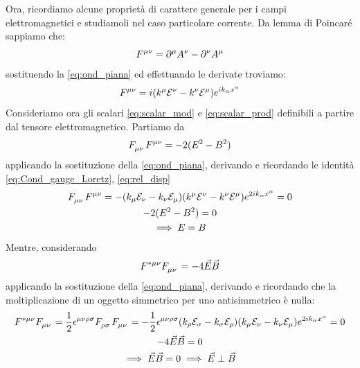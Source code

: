 Ora, ricordiamo alcune proprietà di carattere generale per i campi elettromagnetici e studiamoli nel caso particolare corrente. Da lemma di Poincaré sappiamo che:
\begin{equation*}
    F\indices{^{\mu \nu}}=\partial^\mu A^\nu -\partial^\nu A^\mu
\end{equation*}
sostituendo la \eqref{eq:ond_piana} ed effettuando le derivate troviamo:
\begin{equation}
    F\indices{^{\mu \nu}}=i(k^\mu\mathcal{E}^\nu-k^\nu\mathcal{E}^\mu)e^{ik_\alpha x^\alpha}
\end{equation}
Consideriamo ora gli scalari \eqref{eq:scalar_mod} e \eqref{eq:scalar_prod} definibili a partire dal tensore elettromagnetico. Partiamo da 
\begin{equation}
     F\indices{_{\mu\nu}}F\indices{^{\mu\nu}}=-2(E^2-B^2)
\end{equation} 
applicando la sostituzione della \eqref{eq:ond_piana}, derivando e ricordando le identità \eqref{eq:Cond_gauge_Loretz}, \eqref{eq:rel_disp}
\begin{equation}
\begin{gathered}
    F\indices{_{\mu\nu}}F\indices{^{\mu\nu}}=-(k_\mu\mathcal{E}_\nu-k_\nu\mathcal{E}_\mu)(k^\mu\mathcal{E}^\nu-k^\nu\mathcal{E}^\mu)e^{2ik_\alpha x^\alpha}=0\\
    -2(E^2-B^2)=0\\
      \implies E=B
\end{gathered}
\end{equation}
Mentre, considerando 
\begin{equation}
     F\indices{^{*\mu\nu}}F\indices{_{\mu\nu}}=-4\Vec{E}\Vec{B}
\end{equation} 
applicando la sostituzione della \eqref{eq:ond_piana}, derivando e ricordando che la moltiplicazione di un oggetto simmetrico per uno antisimmetrico è nulla:
\begin{equation}
\begin{gathered}
     F\indices{^{*\mu\nu}}F\indices{_{\mu\nu}}=\dfrac{1}{2}\epsilon\indices{^{\mu\nu\rho\sigma}}F\indices{_{\rho\sigma}}F\indices{_{\mu\nu}}=-\dfrac{1}{2}\epsilon\indices{^{\mu\nu\rho\sigma}} (k_\rho\mathcal{E}_\sigma-k_\sigma\mathcal{E}_\rho)(k_\mu\mathcal{E}_\nu-k_\nu\mathcal{E}_\mu)e^{2ik_\alpha x^\alpha}=0\\
     -4\Vec{E}\Vec{B}=0\\
     \implies\Vec{E}\Vec{B}=0 \implies\Vec{E}\perp\Vec{B}
\end{gathered}
\end{equation}

